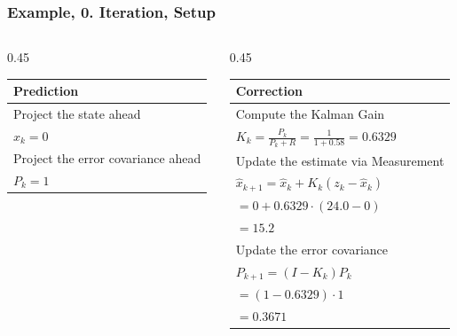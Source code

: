 \documentclass[aspectratio=169]{beamer}
\begin{document}
\begin{frame}
    \frametitle{Example, 0. Iteration, Setup}
    \begin{columns}[T]

        \begin{column}{0.45\textwidth}
            \begin{tabular}{ | l |  }
                \hline
                \bf{Prediction}                    \\
                \hline
                \hline
                Project the state ahead            \\
                \(\hat{x}_{k}  = 0\)               \\
                \hline
                Project the error covariance ahead \\
                \(P_{k} = 1\)                      \\
                \hline
            \end{tabular}
        \end{column}

        \begin{column}{0.45\textwidth}
            \begin{tabular}{ | l |  }
                \hline
                \bf{Correction}                                               \\
                \hline
                \hline
                Compute the Kalman Gain                                       \\
                \(K_{k} = \frac{P_{k}}{P_{k}+R} = \frac{1}{1+0.58} = 0.6329\) \\
                \hline
                Update the estimate via Measurement                           \\
                \(\hat{x}_{k+1} = \hat{x}_{k} + K_{k}(z_{k} - \hat{x}_{k}) \) \\
                \(= 0 + 0.6329 \cdot (24.0 - 0) \)                            \\
                \(= 15.2\)                                                    \\
                \hline
                Update the error covariance                                   \\
                \(P_{k+1} = (I - K_{k})P_{k}\)                                \\
                \(=(1-0.6329)\cdot 1\)                                        \\
                \(= 0.3671\)                                                  \\
                \hline
            \end{tabular}
        \end{column}
    \end{columns}
\end{frame}
\end{document}
